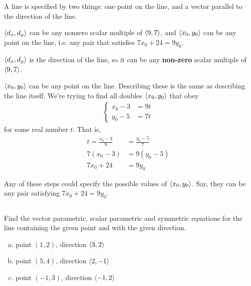 \begin{hint}
A line is specified by two things: one point on the line, and a vector parallel to the direction of the line.
\end{hint}
\begin{answer}
$\left< d_x,d_y\right>$ can be any nonzero scalar multiple of $\left< 9,7\right>$, and $\left< x_0,y_0\right>$ can be any point on the line, i.e. any pair that satisfies $7x_0+24=9y_0$.
\end{answer}
\begin{solution}
$\left< d_x,d_y\right>$ is the direction of the line, so it can be any \textbf{non-zero} scalar multiple of $\left< 9,7\right>$.

$\left< x_0,y_0\right>$ can be any point on the line. Describing these is the same as describing the line itself. We're trying to find all 
doubles $\left< x_0,y_0\right>$  that obey
\begin{align*}
\begin{cases}
x_0-3&=9t\\
y_0-5&=7t
\end{cases}
\end{align*}
for some real number $t$. That is,
\begin{align*}
t=\frac{x_0-3}{9}&=\frac{y_0-5}{7}\\
7(x_0-3)&=9(y_0-5)\\
7x_0+24&=9y_0
\end{align*}

Any of these steps could specify the possible values of $\left< x_0,y_0\right>$. 
Say, they can be any pair satisfying $7x_0+24=9y_0$.
\end{solution}




\subsection*{\Procedural}

\begin{question}
Find the vector parametric, scalar parametric
 and symmetric equations for the line
containing the given point and with the given direction.
\begin{enumerate}[(a)]
\item point $(1,2)$, direction $\left< 3,2\right> $
\item point $(5,4)$, direction $\left< 2,-1\right> $
\item point $(-1,3)$, direction $\left< -1,2\right> $
\end{enumerate}
\end{question}

